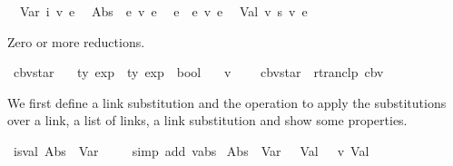 \begin{isabellebody}
\ \ {\isachardoublequoteopen}Var\ i\ {\isasymrightarrow}\isactrlsub v\ e{\isachardoublequoteclose}\isanewline
\ \ {\isachardoublequoteopen}Abs\ {\isasymtau}\ e{}\ {\isasymrightarrow}\isactrlsub v\ e{\isachardoublequoteclose}\isanewline
\ \ {\isachardoublequoteopen}e{}\ {\isasymcdot}\ e{}\ {\isasymrightarrow}\isactrlsub v\ e{\isachardoublequoteclose}\isanewline
\ \ {\isachardoublequoteopen}Val\ v\ s\ {\isasymrightarrow}\isactrlsub v\ e{\isachardoublequoteclose}%
\begin{isamarkuptext}%
Zero or more reductions.%
\end{isamarkuptext}\isamarkuptrue%
\isamarkupfalse%
\ cbv{\isacharunderscore}{\kern0pt}star\ {\isacharcolon}{\kern0pt}{\isacharcolon}{\kern0pt}\isanewline
\ \ {\isachardoublequoteopen}{\isacharprime}{\kern0pt}ty\ exp\ {\isasymRightarrow}\ {\isacharprime}{\kern0pt}ty\ exp\ {\isasymRightarrow}\ bool{\isachardoublequoteclose}\isanewline
\ \ {\isacharparenleft}{\kern0pt}\ {\isachardoublequoteopen}{\isasymrightarrow}\isactrlsub v\isactrlsup {\isacharasterisk}{\kern0pt}{\isachardoublequoteclose}\ {}{}{\isacharparenright}{\kern0pt}\ \isanewline
\ \ {\isachardoublequoteopen}cbv{\isacharunderscore}{\kern0pt}star\ {\isasymequiv}\ rtranclp\ cbv{\isachardoublequoteclose}%
\isadelimdocument
%
\endisadelimdocument
%
\isatagdocument
%
\isamarkuptrue%
%
\endisatagdocument
{\isafolddocument}%
%
\isadelimdocument
%
\endisadelimdocument
%
\begin{isamarkuptext}%
We first define a link substitution and the operation to apply the substitutions
  over a link, a list of links, a link substitution
  and show some properties.%
\end{isamarkuptext}\isamarkuptrue%
\isamarkupfalse%
\ {\isachardoublequoteopen}is{\isacharunderscore}{\kern0pt}val\ {\isacharparenleft}{\kern0pt}Abs\ {\isasymtau}{}\ {\isacharparenleft}{\kern0pt}Var\ {}{\isacharparenright}{\kern0pt}{\isacharparenright}{\kern0pt}{\isachardoublequoteclose}\isanewline
%
\isadelimproof
\ \ %
\endisadelimproof
%
\isatagproof
{}\isamarkupfalse%
\ {\isacharparenleft}{\kern0pt}simp\ add{\isacharcolon}{\kern0pt}\ v{\isacharunderscore}{\kern0pt}abs{\isacharparenright}{\kern0pt}%
\endisatagproof
{\isafoldproof}%
%
\isadelimproof
\isanewline
%
\endisadelimproof
\isanewline
\isanewline
{}\isamarkupfalse%
\ {\isachardoublequoteopen}{\isacharparenleft}{\kern0pt}Abs\ {\isasymtau}{}\ {\isacharparenleft}{\kern0pt}Var\ {}{\isacharparenright}{\kern0pt}{\isacharparenright}{\kern0pt}\ {\isasymcdot}\ Val\ {}\ {}\ {\isasymrightarrow}\isactrlsub v\ Val\ {}\ {}{\isachardoublequoteclose}\isanewline

\end{isabellebody}
